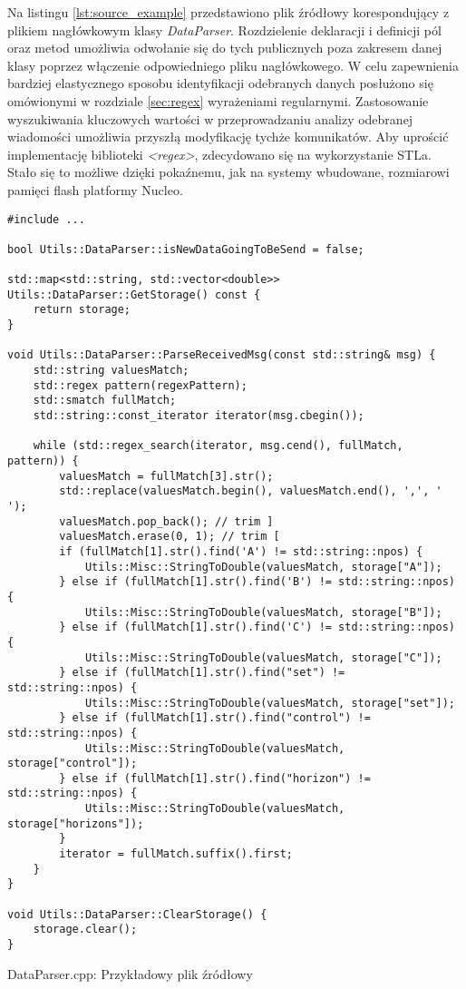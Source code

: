 Na listingu \ref{lst:source_example} przedstawiono plik źródłowy korespondujący z plikiem
nagłówkowym klasy \textit{DataParser}. Rozdzielenie deklaracji i definicji pól oraz metod umożliwia
odwołanie się do tych publicznych poza zakresem danej klasy poprzez włączenie odpowiedniego 
pliku nagłówkowego. W celu zapewnienia bardziej elastycznego sposobu identyfikacji odebranych
danych posłużono się omówionymi w rozdziale \ref{sec:regex} wyrażeniami regularnymi. Zastosowanie
wyszukiwania kluczowych wartości w przeprowadzaniu analizy odebranej wiadomości umożliwia
przyszłą modyfikację tychże komunikatów. Aby uprościć implementację biblioteki \textit{<regex>},
zdecydowano się na wykorzystanie STLa. Stało się to możliwe dzięki pokaźnemu, jak na systemy
wbudowane, rozmiarowi pamięci flash platformy Nucleo. 

\begin{listing}[htb]
\centering
\begin{verbatim}
#include ...

bool Utils::DataParser::isNewDataGoingToBeSend = false;

std::map<std::string, std::vector<double>> Utils::DataParser::GetStorage() const {
    return storage;
}

void Utils::DataParser::ParseReceivedMsg(const std::string& msg) {
    std::string valuesMatch;
    std::regex pattern(regexPattern);
    std::smatch fullMatch;
    std::string::const_iterator iterator(msg.cbegin());

    while (std::regex_search(iterator, msg.cend(), fullMatch, pattern)) {
        valuesMatch = fullMatch[3].str();
        std::replace(valuesMatch.begin(), valuesMatch.end(), ',', ' ');
        valuesMatch.pop_back(); // trim ]
        valuesMatch.erase(0, 1); // trim [
        if (fullMatch[1].str().find('A') != std::string::npos) {
            Utils::Misc::StringToDouble(valuesMatch, storage["A"]);
        } else if (fullMatch[1].str().find('B') != std::string::npos) {
            Utils::Misc::StringToDouble(valuesMatch, storage["B"]);
        } else if (fullMatch[1].str().find('C') != std::string::npos) {
            Utils::Misc::StringToDouble(valuesMatch, storage["C"]);
        } else if (fullMatch[1].str().find("set") != std::string::npos) {
            Utils::Misc::StringToDouble(valuesMatch, storage["set"]);
        } else if (fullMatch[1].str().find("control") != std::string::npos) {
            Utils::Misc::StringToDouble(valuesMatch, storage["control"]);
        } else if (fullMatch[1].str().find("horizon") != std::string::npos) {
            Utils::Misc::StringToDouble(valuesMatch, storage["horizons"]);
        }
        iterator = fullMatch.suffix().first;
    }
}

void Utils::DataParser::ClearStorage() {
    storage.clear();
}
\end{verbatim}
\caption{DataParser.cpp: Przykładowy plik źródłowy}
\label{lst:source_example}
\end{listing}

